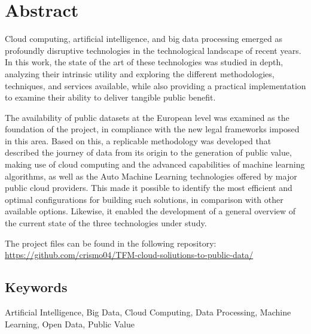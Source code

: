 \chapter*{Abstract}

Cloud computing, artificial intelligence, and big data processing emerged as profoundly disruptive technologies in the technological landscape of recent years. In this work, the state of the art of these technologies was studied in depth, analyzing their intrinsic utility and exploring the different methodologies, techniques, and services available, while also providing a practical implementation to examine their ability to deliver tangible public benefit.

The availability of public datasets at the European level was examined as the foundation of the project, in compliance with the new legal frameworks imposed in this area. Based on this, a replicable methodology was developed that described the journey of data from its origin to the generation of public value, making use of cloud computing and the advanced capabilities of machine learning algorithms, as well as the Auto Machine Learning technologies offered by major public cloud providers. This made it possible to identify the most efficient and optimal configurations for building such solutions, in comparison with other available options. Likewise, it enabled the development of a general overview of the current state of the three technologies under study. %

The project files can be found in the following repository: \url{https://github.com/crismo04/TFM-cloud-soliutions-to-public-data/}

\section*{Keywords}

\noindent Artificial Intelligence, Big Data, Cloud Computing, Data Processing, Machine Learning, Open Data, Public Value


